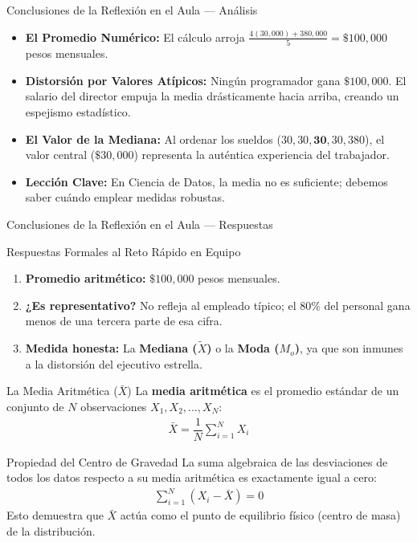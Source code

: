 \documentclass[10pt,aspectratio=169]{beamer}
\begin{document}
\begin{frame}{Conclusiones de la Reflexión en el Aula — Análisis}
  \begin{itemize}
    \item \textbf{El Promedio Numérico:} El cálculo arroja $\frac{4(30,000) + 380,000}{5} = \$100,000$ pesos mensuales. \pause
    \item \textbf{Distorsión por Valores Atípicos:} Ningún programador gana $\$100,000$. El salario del director empuja la media drásticamente hacia arriba, creando un espejismo estadístico. \pause
    \item \textbf{El Valor de la Mediana:} Al ordenar los sueldos ($30, 30, \mathbf{30}, 30, 380$), el valor central ($\$30,000$) representa la auténtica experiencia del trabajador. \pause
    \item \textbf{Lección Clave:} En Ciencia de Datos, la media no es suficiente; debemos saber cuándo emplear medidas robustas.
  \end{itemize}
\end{frame}

\begin{frame}{Conclusiones de la Reflexión en el Aula — Respuestas}
  \begin{block}{Respuestas Formales al Reto Rápido en Equipo}
    \begin{enumerate}
      \item \textbf{Promedio aritmético:} $\$100,000$ pesos mensuales. \pause
      \item \textbf{¿Es representativo?} No refleja al empleado típico; el $80\%$ del personal gana menos de una tercera parte de esa cifra. \pause
      \item \textbf{Medida honesta:} La \textbf{Mediana ($\tilde{X}$)} o la \textbf{Moda ($M_o$)}, ya que son inmunes a la distorsión del ejecutivo estrella.
    \end{enumerate}
  \end{block}
\end{frame}

\begin{frame}{La Media Aritmética ($\bar{X}$)}
  La \textbf{media aritmética} es el promedio estándar de un conjunto de $N$ observaciones $X_1, X_2, \dots, X_N$:
  \begin{align}
    \bar{X} = \dfrac{1}{N} \sum_{i=1}^{N} X_i
  \end{align}
  \pause
  \begin{block}{Propiedad del Centro de Gravedad}
    La suma algebraica de las desviaciones de todos los datos respecto a su media aritmética es exactamente igual a cero:
    \begin{align}
      \sum_{i=1}^{N} (X_i - \bar{X}) = 0
    \end{align}
    Esto demuestra que $\bar{X}$ actúa como el punto de equilibrio físico (centro de masa) de la distribución.
  \end{block}
\end{frame}
\end{document}
